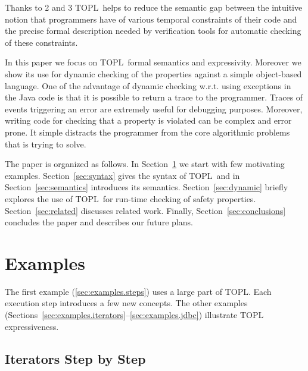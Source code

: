 \documentclass[preprint]{sigplanconf} %
\newcommand{\TPL}{TOPL}
\newcommand{\note}[2]{\textcolor{gray}{[\textcolor{red}{#1}: #2]}}
\newcommand{\rg}[1]{\note{rg}{#1}}
\theoremstyle{definition}
\theoremstyle{remark}
\begin{document}
Thanks to 2 and 3 \TPL \ helps to reduce the semantic gap between the intuitive notion that programmers have of various temporal constraints of their code and the precise formal description needed by verification tools for automatic 
checking of these constraints.

In this paper we focus on \TPL \ formal semantics and expressivity.
Moreover we show its use for dynamic checking of the properties against  a simple object-based language.
One of the advantage of dynamic checking w.r.t. using exceptions in the Java code is that it is possible to return a trace to the programmer.
Traces of events triggering an error are extremely useful for debugging purposes.
Moreover, writing code for checking that a property is violated can be complex and error prone. It simple distracts the programmer from the core algorithmic problems that is trying to solve.


The paper is organized as follows. In Section~\ref{sec:examples} we start with few motivating examples.
Section~\ref{sec:syntax} gives the syntax of \TPL \ and in Section~\ref{sec:semantics} introduces its semantics.
Section~\ref{sec:dynamic} briefly explores the use of \TPL \ for run-time checking of safety properties.
Section~\ref{sec:related} discusses related work.
Finally, Section~\ref{sec:conclusions} concludes the paper
and describes our future plans.

\section{Examples} \label{sec:examples} %

The first example (\autoref{sec:examples.steps}) uses a large part of \TPL\null.
Each execution step introduces a few new concepts.
The other examples (Sections~\ref*{sec:examples.iterators}--\ref*{sec:examples.jdbc}) illustrate TOPL expressiveness.

\subsection{Iterators Step by Step} \label{sec:examples.steps} %
\end{document}
